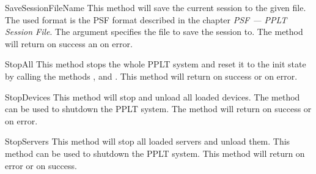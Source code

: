 \begin{methoddesc}[System]{SaveSession}{FileName}
This method will save the current session to the given file. The used
format is the PSF format described in the chapter 
\emph{PSF --- PPLT Session File}. The argument  specifies
the file to save the session to. The method will return  on 
success an  on error.
\end{methoddesc}


\begin{methoddesc}[System]{StopAll}{}
This method stops the whole PPLT system and reset it to the init state by calling  the 
methods ,  and
. This method will return  on success or
 on error.
\end{methoddesc}


\begin{methoddesc}[System]{StopDevices}{}
This method will stop and unload all loaded devices. The method can be used to
shutdown the PPLT system. The method will return  on success or 
 on error.
\end{methoddesc}


\begin{methoddesc}[System]{StopServers}{}
This method will stop all loaded servers and unload them. This method can be used 
to shutdown the PPLT system. This method will return  on error or 
 on success.
\end{methoddesc}

